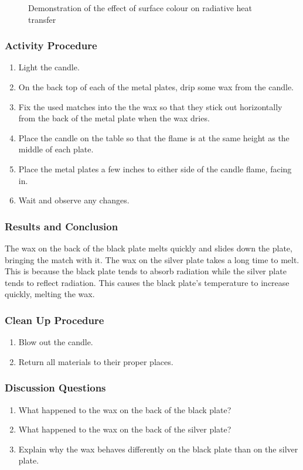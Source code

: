 \begin{figure}
\begin{center}
\def\svgwidth{200pt}

\caption{Demonstration of the effect of surface colour on radiative heat transfer}
\label{fig:radiation}
\end{center}
\end{figure}

\subsubsection*{Activity Procedure}
\begin{enumerate}
\item{Light the candle.}
\item{On the back top of each of the metal plates, drip some wax from the candle.}
\item{Fix the used matches into the the wax so that they stick out horizontally from the back of the metal plate when the wax dries.}
\item{Place the candle on the table so that the flame is at the same height as the middle of each plate.}
\item{Place the metal plates a few inches to either side of the candle flame, facing in.}
\item{Wait and observe any changes.}
\end{enumerate}

\subsubsection*{Results and Conclusion}
The wax on the back of the black plate melts quickly and slides down the plate, bringing the match with it.  The wax on the silver plate takes a long time to melt.  This is because the black plate tends to absorb radiation while the silver plate tends to reflect radiation.  This causes the black plate's temperature to increase quickly, melting the wax.

\subsubsection*{Clean Up Procedure}
\begin{enumerate}
\item{Blow out the candle.}
\item{Return all materials to their proper places.}
\end{enumerate}

\subsubsection*{Discussion Questions}
\begin{enumerate}
\item{What happened to the wax on the back of the black plate?}
\item{What happened to the wax on the back of the silver plate?}
\item{Explain why the wax behaves differently on the black plate than on the silver plate.}
\end{enumerate}

